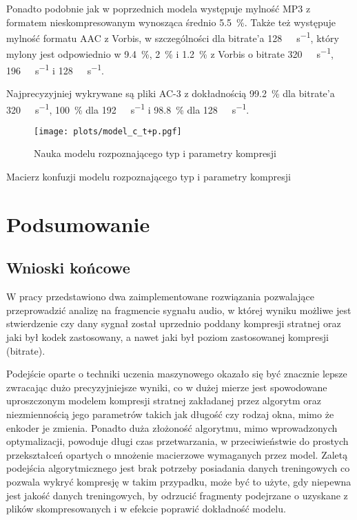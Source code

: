 \documentclass[pl,12pt]{aghdpl}
\let\Oldchapter\chapter%
\renewcommand{\chapter}{\FloatBarrier\Oldchapter}
\let\Oldsection\section%
\renewcommand{\section}{\FloatBarrier\Oldsection}
\begin{document}
Ponadto podobnie jak w poprzednich modela występuje mylność MP3 z formatem
nieskompresowanym wynosząca średnio \SI{5.5}{\percent}. Także też występuje
mylność formatu AAC z Vorbis, w szczególności dla bitrate'a
\SI{128}{\kibi\bit\per\second}, który mylony jest odpowiednio w \SI{9.4}{\percent},
\SI{2}{\percent} i \SI{1.2}{\percent} z Vorbis o bitrate
\SI{320}{\kibi\bit\per\second}, \SI{196}{\kibi\bit\per\second} i
\SI{128}{\kibi\bit\per\second}.

Najprecyzyjniej wykrywane są pliki AC-3 z dokładnością \SI{99.2}{\percent} dla
bitrate'a \SI{320}{\kibi\bit\per\second}, \SI{100}{\percent} dla
\SI{192}{\kibi\bit\per\second} i \SI{98.8}{\percent} dla
\SI{128}{\kibi\bit\per\second}.

\begin{figure}[!tbh]
  \centering
  \texttt{[image: plots/model\_c\_t+p.pgf]}
  \caption{Nauka modelu rozpoznającego typ i parametry kompresji}
  \label{fig:model_c_t+p}
\end{figure}
\begin{sidewaystable}[!tbh]
  \centering
  \caption{Macierz konfuzji modelu rozpoznającego typ i parametry kompresji}
  
  \label{tab:model_c_t+p}
\end{sidewaystable}

\chapter{Podsumowanie}
\section{Wnioski końcowe}
W pracy przedstawiono dwa zaimplementowane rozwiązania pozwalające
przeprowadzić analizę na fragmencie sygnału audio, w której wyniku możliwe jest
stwierdzenie czy dany sygnał został uprzednio poddany kompresji stratnej oraz
jaki był kodek zastosowany, a nawet jaki był poziom zastosowanej kompresji
(bitrate).

Podejście oparte o techniki uczenia maszynowego okazało się być znacznie lepsze
zwracając dużo precyzyjniejsze wyniki, co w dużej mierze jest spowodowane
uproszczonym modelem kompresji stratnej zakładanej przez algorytm oraz
niezmiennością jego parametrów takich jak długość czy rodzaj okna, mimo że
enkoder je zmienia. Ponadto duża złożoność algorytmu, mimo wprowadzonych
optymalizacji, powoduje długi czas przetwarzania, w przeciwieństwie do prostych
przekształceń opartych o mnożenie macierzowe wymaganych przez model. Zaletą
podejścia algorytmicznego jest brak potrzeby posiadania danych treningowych co
pozwala wykryć kompresję w takim przypadku, może być to użyte, gdy niepewna
jest jakość danych treningowych, by odrzucić fragmenty podejrzane o uzyskane
z plików skompresowanych i w efekcie poprawić dokładność modelu.
\end{document}
